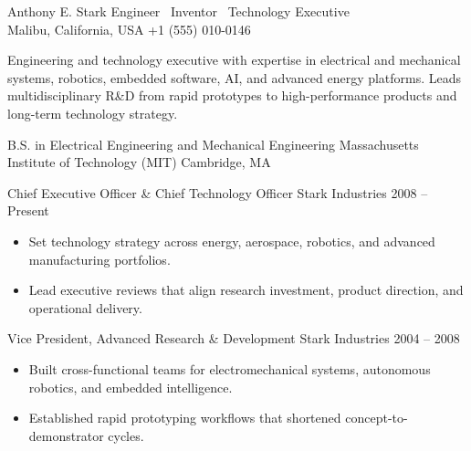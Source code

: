 
\resumeheader
    {Anthony E. Stark}
    {Engineer \textbar\ Inventor \textbar\ Technology Executive}
    {
        \quad\textbar\quad
        \quad\textbar\quad
        \\[0.15em]
        Malibu, California, USA
        \quad\textbar\quad
        +1 (555) 010-0146
    }

\resumesection{\summarytitle}

Engineering and technology executive with expertise in electrical and mechanical systems, robotics, embedded software, AI, and advanced energy platforms. Leads multidisciplinary R\&D from rapid prototypes to high-performance products and long-term technology strategy.

\resumesection{\educationtitle}

\resumeentry
    {B.S. in Electrical Engineering and Mechanical Engineering}
    {Massachusetts Institute of Technology (MIT)}
    {Cambridge, MA}

\resumesection{\experiencetitle}

\resumeentry
    {Chief Executive Officer \& Chief Technology Officer}
    {Stark Industries}
    {2008 -- Present}
\begin{itemize}
    \item Set technology strategy across energy, aerospace, robotics, and advanced manufacturing portfolios.
    \item Lead executive reviews that align research investment, product direction, and operational delivery.
\end{itemize}

\resumeentry
    {Vice President, Advanced Research \& Development}
    {Stark Industries}
    {2004 -- 2008}
\begin{itemize}
    \item Built cross-functional teams for electromechanical systems, autonomous robotics, and embedded intelligence.
    \item Established rapid prototyping workflows that shortened concept-to-demonstrator cycles.
\end{itemize}

